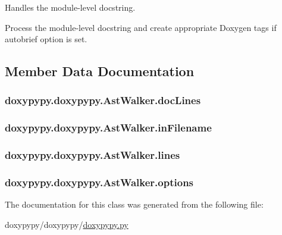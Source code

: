 Handles the module-\/level docstring. 

Process the module-\/level docstring and create appropriate Doxygen tags if autobrief option is set. 

\subsection{Member Data Documentation}
\hypertarget{classdoxypypy_1_1doxypypy_1_1_ast_walker_a3683c5fcc8b34d2c369ca2d06522e80b}{
\subsubsection[{doc\-Lines}]{\setlength{\rightskip}{0pt plus 5cm}doxypypy.\-doxypypy.\-Ast\-Walker.\-doc\-Lines}}\label{classdoxypypy_1_1doxypypy_1_1_ast_walker_a3683c5fcc8b34d2c369ca2d06522e80b}
\hypertarget{classdoxypypy_1_1doxypypy_1_1_ast_walker_ad509d320dcdb995e199dad9cf35957bb}{
\subsubsection[{in\-Filename}]{\setlength{\rightskip}{0pt plus 5cm}doxypypy.\-doxypypy.\-Ast\-Walker.\-in\-Filename}}\label{classdoxypypy_1_1doxypypy_1_1_ast_walker_ad509d320dcdb995e199dad9cf35957bb}
\hypertarget{classdoxypypy_1_1doxypypy_1_1_ast_walker_ab77b4c94a443f0fbdf0fcd28f69ff8c4}{
\subsubsection[{lines}]{\setlength{\rightskip}{0pt plus 5cm}doxypypy.\-doxypypy.\-Ast\-Walker.\-lines}}\label{classdoxypypy_1_1doxypypy_1_1_ast_walker_ab77b4c94a443f0fbdf0fcd28f69ff8c4}
\hypertarget{classdoxypypy_1_1doxypypy_1_1_ast_walker_ae8bf6ec89e1a489b597f7955ba75cab3}{
\subsubsection[{options}]{\setlength{\rightskip}{0pt plus 5cm}doxypypy.\-doxypypy.\-Ast\-Walker.\-options}}\label{classdoxypypy_1_1doxypypy_1_1_ast_walker_ae8bf6ec89e1a489b597f7955ba75cab3}


The documentation for this class was generated from the following file\-:\begin{DoxyCompactItemize}
\item 
doxypypy/doxypypy/\hyperlink{doxypypy_8py}{doxypypy.\-py}\end{DoxyCompactItemize}

